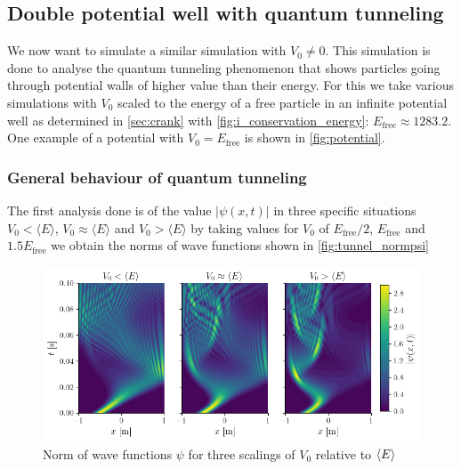 \subsection{Double potential well with quantum tunneling}
We now want to simulate a similar simulation with $V_0 \neq 0$. This simulation is done to analyse the quantum tunneling phenomenon that shows particles going through potential walls of higher value than their energy. For this we take various simulations with $V_0$ scaled to the energy of a free particle in an infinite potential well as determined in \autoref{sec:crank} with \autoref{fig:i_conservation_energy}: $E_\mathrm{free} \approx 1283.2$. One example of a potential with $V_0 = E_\mathrm{free}$ is shown in \autoref{fig:potential}.

\subsubsection{General behaviour of quantum tunneling}
The first analysis done is of the value $|\psi(x,t)|$ in three specific situations $V_0<\langle E \rangle$, $V_0\approx\langle E \rangle$ and $V_0>\langle E \rangle$ by taking values for $V_0$ of $E_\mathrm{free}/2$, $E_\mathrm{free}$ and $1.5 E_\mathrm{free}$ we obtain the norms of wave functions shown in \autoref{fig:tunnel_normpsi}
\begin{figure}[h]
    \centering
    \includegraphics[width = \linewidth]{figures/tunnel_normpsi.png}
    \caption{Norm of wave functions $\psi$ for three scalings of $V_0$ relative to $\langle E \rangle$}
    \label{fig:tunnel_normpsi}
\end{figure}

